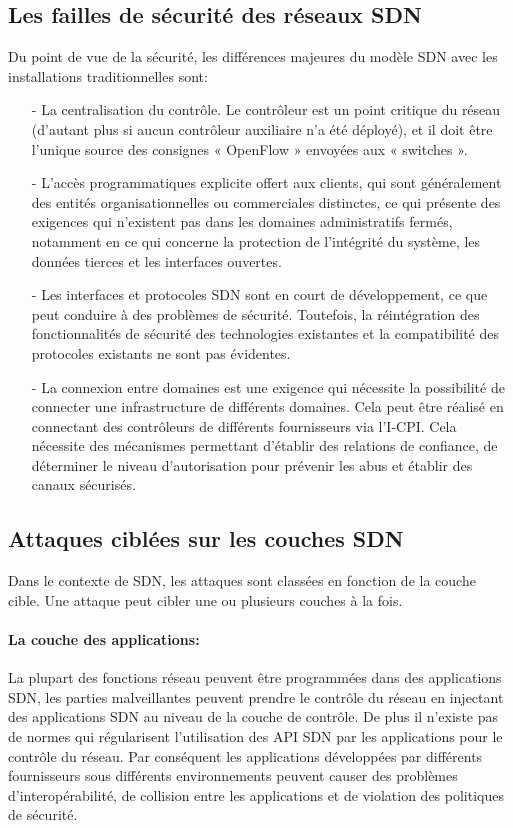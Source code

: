 \subsection{Les failles de sécurité des réseaux SDN}
Du point de vue de la sécurité, les différences majeures du modèle SDN avec les installations traditionnelles sont: \\
\begin{itemize}
\item[-]La centralisation du contrôle. Le contrôleur est un point critique du réseau (d’autant plus si aucun contrôleur auxiliaire n’a été déployé), et il doit être l’unique source des consignes « OpenFlow » envoyées aux « switches ».\\
\item[-]L’accès programmatiques explicite offert aux clients, qui sont généralement des entités organisationnelles  ou commerciales distinctes, ce qui présente des exigences qui n’existent pas dans les domaines administratifs fermés, notamment en ce qui concerne la protection de l’intégrité du système, les données tierces et les interfaces ouvertes.\\
\item[-]Les interfaces et protocoles SDN sont en court de développement, ce que peut conduire à des problèmes de sécurité. Toutefois, la réintégration des fonctionnalités de sécurité des technologies existantes et la compatibilité des protocoles existants ne sont pas évidentes.\\
\item[-]La connexion entre domaines est une exigence qui nécessite la possibilité de connecter une infrastructure de différents domaines. Cela peut être réalisé en connectant des contrôleurs de différents fournisseurs via l’I-CPI. Cela nécessite des mécanismes permettant d’établir des relations de confiance, de déterminer le niveau d’autorisation pour prévenir les abus et établir des canaux sécurisés.
\end{itemize}

\newpage
\subsection{Attaques ciblées sur les couches SDN}
\label{cibles}
Dans le contexte de SDN, les attaques sont classées en fonction de la couche cible. Une attaque peut cibler une ou plusieurs couches à la fois.
\paragraph{La couche des applications:} 
La plupart des fonctions réseau peuvent être programmées dans des applications SDN, les parties malveillantes peuvent prendre le contrôle du réseau en injectant des applications SDN au niveau de la couche de contrôle. De plus il n’existe pas de normes qui régularisent l’utilisation des API SDN par les applications pour le contrôle du réseau. Par conséquent les applications développées par différents fournisseurs sous différents environnements peuvent causer des problèmes d’interopérabilité, de collision entre les applications et de violation des politiques de sécurité.  

